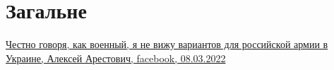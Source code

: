  
 
 
 
 
\section{Загальне}

\hyperlink{08_03_2022.fb.arestovich_alexei.1.varianty}{%
Честно говоря, как военный, я не вижу вариантов для российской армии в Украине, Алексей Арестович, %
facebook, 08.03.2022%
}
